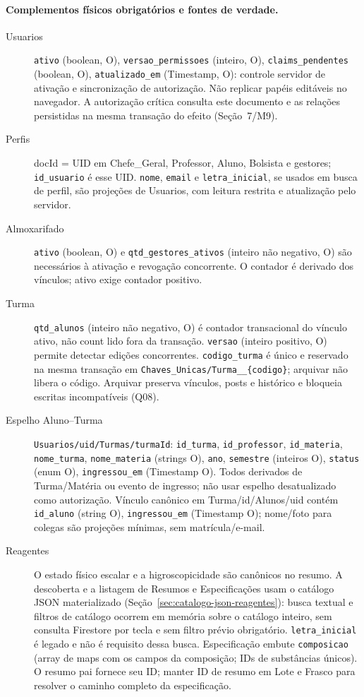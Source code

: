 \paragraph{Complementos físicos obrigatórios e fontes de verdade.}
\begin{description}
\item[Usuarios] \texttt{ativo} (boolean, O), \texttt{versao\_permissoes} (inteiro, O), \texttt{claims\_pendentes} (boolean, O), \texttt{atualizado\_em} (Timestamp, O): controle servidor de ativação e sincronização de autorização. Não replicar papéis editáveis no navegador. A autorização crítica consulta este documento e as relações persistidas na mesma transação do efeito (Seção~7/M9).
\item[Perfis] docId = UID em Chefe\_Geral, Professor, Aluno, Bolsista e gestores; \texttt{id\_usuario} é esse UID. \texttt{nome}, \texttt{email} e \texttt{letra\_inicial}, se usados em busca de perfil, são projeções de Usuarios, com leitura restrita e atualização pelo servidor.
\item[Almoxarifado] \texttt{ativo} (boolean, O) e \texttt{qtd\_gestores\_ativos} (inteiro não negativo, O) são necessários à ativação e revogação concorrente. O contador é derivado dos vínculos; ativo exige contador positivo.
\item[Turma] \texttt{qtd\_alunos} (inteiro não negativo, O) é contador transacional do vínculo ativo, não count lido fora da transação. \texttt{versao} (inteiro positivo, O) permite detectar edições concorrentes. \texttt{codigo\_turma} é único e reservado na mesma transação em \texttt{Chaves\_Unicas/Turma\_\_\{codigo\}}; arquivar não libera o código. Arquivar preserva vínculos, posts e histórico e bloqueia escritas incompatíveis (Q08).
\item[Espelho Aluno--Turma] \texttt{Usuarios/uid/Turmas/turmaId}: \texttt{id\_turma}, \texttt{id\_professor}, \texttt{id\_materia}, \texttt{nome\_turma}, \texttt{nome\_materia} (strings O), \texttt{ano}, \texttt{semestre} (inteiros O), \texttt{status} (enum O), \texttt{ingressou\_em} (Timestamp O). Todos derivados de Turma/Matéria ou evento de ingresso; não usar espelho desatualizado como autorização. Vínculo canônico em Turma/id/Alunos/uid contém \texttt{id\_aluno} (string O), \texttt{ingressou\_em} (Timestamp O); nome/foto para colegas são projeções mínimas, sem matrícula/e-mail.
\item[Reagentes] O estado físico escalar e a higroscopicidade são canônicos no resumo. A descoberta e a listagem de Resumos e Especificações usam o catálogo JSON materializado (Seção~\ref{sec:catalogo-json-reagentes}): busca textual e filtros de catálogo ocorrem em memória sobre o catálogo inteiro, sem consulta Firestore por tecla e sem filtro prévio obrigatório. \texttt{letra\_inicial} é legado e não é requisito dessa busca. Especificação embute \texttt{composicao} (array de maps com os campos da composição; IDs de substâncias únicos). O resumo pai fornece seu ID; manter ID de resumo em Lote e Frasco para resolver o caminho completo da especificação.

\end{description}
